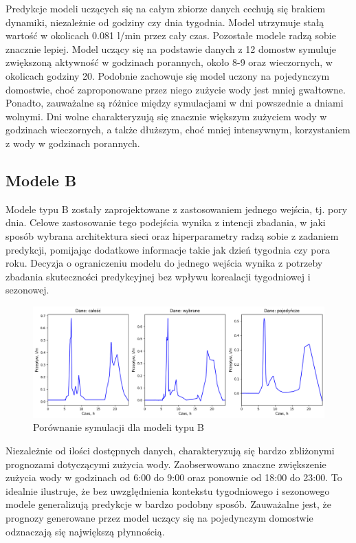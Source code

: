\documentclass[a4paper,twoside,12pt]{book}
\begin{document}
Predykcje modeli uczących się na całym zbiorze danych cechują się brakiem dynamiki, niezależnie od godziny czy dnia tygodnia. Model utrzymuje stałą wartość w okolicach 0.081 l/min przez cały czas. Pozostałe modele radzą sobie znacznie lepiej. Model uczący się na podstawie danych z 12 domostw symuluje zwiększoną aktywność w godzinach porannych, około 8-9 oraz wieczornych, w okolicach godziny 20. Podobnie zachowuje się model uczony na pojedynczym domostwie, choć zaproponowane przez niego zużycie wody jest mniej gwałtowne. Ponadto, zauważalne są różnice między symulacjami w dni powszednie a dniami wolnymi. Dni wolne charakteryzują się znacznie większym zużyciem wody w godzinach wieczornych, a także dłuższym, choć mniej intensywnym, korzystaniem z wody w godzinach porannych.

\subsection*{Modele B}
Modele typu B zostały zaprojektowane z zastosowaniem jednego wejścia, tj. pory dnia. Celowe zastosowanie tego podejścia wynika z intencji zbadania, w jaki sposób wybrana architektura sieci oraz hiperparametry radzą sobie z zadaniem predykcji, pomijając dodatkowe informacje takie jak dzień tygodnia czy pora roku. Decyzja o ograniczeniu modelu do jednego wejścia wynika z potrzeby zbadania skuteczności predykcyjnej bez wpływu korealacji tygodniowej i sezonowej.
\begin{figure}[!h]
  \centering
  \includegraphics[width=1\textwidth]{img/Model_B.png}
  \caption{Porównanie symulacji dla modeli typu B}
  \label{fig:etykieta-rysunku}
\end{figure}

Niezależnie od ilości dostępnych danych, charakteryzują się bardzo zbliżonymi prognozami dotyczącymi zużycia wody. Zaobserwowano znaczne zwiększenie zużycia wody w godzinach od 6:00 do 9:00 oraz ponownie od 18:00 do 23:00. To idealnie ilustruje, że bez uwzględnienia kontekstu tygodniowego i sezonowego modele generalizują predykcje w bardzo podobny sposób. Zauważalne jest, że prognozy generowane przez model uczący się na pojedynczym domostwie odznaczają się największą płynnością.
\end{document}
